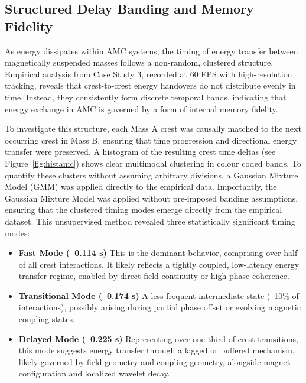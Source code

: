\documentclass[10pt,aps,pre,onecolumn,superscriptaddress,notitlepage]{revtex4-2}
\begin{document}
\subsection{Structured Delay Banding and Memory Fidelity}
\label{sec:StructuredDelayBandingandMemoryFidelity}
As energy dissipates within AMC systems, the timing of energy transfer between magnetically suspended masses follows a non-random, clustered structure. Empirical analysis from Case Study 3, recorded at 60 FPS with high-resolution tracking, reveals that crest-to-crest energy handovers do not distribute evenly in time. Instead, they consistently form discrete temporal bands, indicating that energy exchange in AMC is governed by a form of internal memory fidelity.


To investigate this structure, each Mass A crest was causally matched to the next occurring crest in Mass B, ensuring that time progression and directional energy transfer were preserved. 
A histogram of the resulting crest time deltas (see Figure~\ref{fig:histamc}) shows clear multimodal clustering in colour coded bands.
To quantify these clusters without assuming arbitrary divisions, a Gaussian Mixture Model (GMM) was applied directly to the empirical data. Importantly, the Gaussian Mixture Model was applied without pre-imposed banding assumptions, ensuring that the clustered timing modes emerge directly from the empirical dataset. This unsupervised method revealed three statistically significant timing modes:

\begin{itemize}
    \item \textbf{Fast Mode (~0.114 s)}
 This is the dominant behavior, comprising over half of all crest interactions. It likely reflects a tightly coupled, low-latency energy transfer regime, enabled by direct field continuity or high phase coherence.


    \item \textbf{Transitional Mode (~0.174 s)}
 A less frequent intermediate state (~10\% of interactions), possibly arising during partial phase offset or evolving magnetic coupling states.


    \item \textbf{Delayed Mode (~0.225 s)}
 Representing over one-third of crest transitions, this mode suggests energy transfer through a lagged or buffered mechanism, likely governed by field geometry and coupling geometry, alongside magnet configuration and localized wavelet decay.
\end{itemize}
\end{document}
